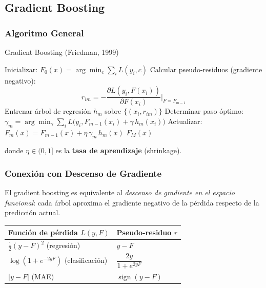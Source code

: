 \documentclass[12pt, a4paper]{article}
\DeclareMathOperator{\sign}{sign}
\begin{document}
\subsection{Gradient Boosting}

\subsubsection{Algoritmo General}

\begin{algbox}{Gradient Boosting (Friedman, 1999)}
	\begin{algorithmic}[1]
		\State Inicializar: $F_0(x) = \arg\min_c \sum_i L(y_i, c)$
		\State Calcular pseudo-residuos (gradiente negativo):
		\[
			r_{im} = -\frac{\partial L(y_i, F(x_i))}{\partial F(x_i)}\bigg|_{F=F_{m-1}}
		\]
		\State Entrenar árbol de regresión $h_m$ sobre $\{(x_i, r_{im})\}$
		\State Determinar paso óptimo:
		$\gamma_m = \arg\min_\gamma \sum_i L\bigl(y_i, F_{m-1}(x_i) + \gamma\, h_m(x_i)\bigr)$
		\State Actualizar: $F_m(x) = F_{m-1}(x) + \eta\,\gamma_m\, h_m(x)$
		\EndFor
		\State \Return $F_M(x)$
	\end{algorithmic}
\end{algbox}

donde $\eta \in (0,1]$ es la \textbf{tasa de aprendizaje} (shrinkage).

\subsubsection{Conexión con Descenso de Gradiente}

El gradient boosting es equivalente al \emph{descenso de gradiente en el espacio funcional}:
cada árbol aproxima el gradiente negativo de la pérdida respecto de la predicción actual.

\begin{center}
	\begin{tabular}{ll}
		\toprule
		\textbf{Función de pérdida} $L(y, F)$ & \textbf{Pseudo-residuo} $r$ \\
		\midrule
		$\tfrac{1}{2}(y-F)^2$ (regresión)     & $y - F$                     \\
		$\log(1+e^{-2yF})$ (clasificación)    & $\dfrac{2y}{1+e^{2yF}}$     \\
		$|y-F|$ (MAE)                         & $\sign(y-F)$                \\
		\bottomrule
	\end{tabular}
\end{center}
\end{document}
